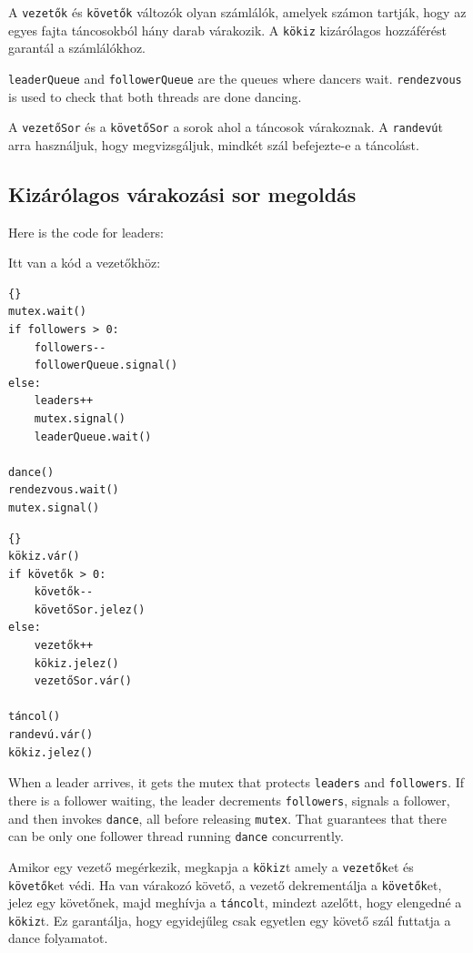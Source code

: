 \documentclass{book}
\newcommand{\clearemptydoublepage}{\newpage\cleardoublepage}
\begin{document}
A {\tt vezetők} és {\tt követők} változók olyan számlálók, amelyek számon
tartják, hogy az egyes fajta táncosokból hány darab várakozik.
A {\tt kökiz} kizárólagos hozzáférést garantál a számlálókhoz.

{\tt leaderQueue} and {\tt followerQueue} are the queues where
dancers wait.  {\tt rendezvous} is used to check that both threads
are done dancing.

A {\tt vezetőSor} és a {\tt követőSor} a sorok ahol a táncosok várakoznak.
A {\tt randevú}t arra használjuk, hogy megvizsgáljuk, mindkét szál
befejezte-e a táncolást.

\clearemptydoublepage
\subsection {Kizárólagos várakozási sor megoldás}

Here is the code for leaders:

Itt van a kód a vezetőkhöz:

\begin{lstlisting}[title={Queue solution (leaders)}]{}
mutex.wait()
if followers > 0:
    followers--
    followerQueue.signal()
else:
    leaders++
    mutex.signal()
    leaderQueue.wait()    

dance()
rendezvous.wait()
mutex.signal()
\end{lstlisting}

\begin{lstlisting}[title={Kizárólagos várakozási sor megoldás (vezetők)}]{}
kökiz.vár()
if követők > 0:
    követők--
    követőSor.jelez()
else:
    vezetők++
    kökiz.jelez()
    vezetőSor.vár()    

táncol()
randevú.vár()
kökiz.jelez()
\end{lstlisting}

When a leader arrives, it gets the mutex that protects {\tt leaders}
and {\tt followers}.  If there is a follower waiting, the leader
decrements {\tt followers}, signals a follower, and then invokes
{\tt dance}, all before releasing {\tt mutex}.  That guarantees that
there can be only one follower thread running {\tt dance}
concurrently.

Amikor egy vezető megérkezik, megkapja a {\tt kökiz}t amely a {\tt vezetők}et és
{\tt követők}et védi. Ha van várakozó követő, a vezető dekrementálja a
{\tt követők}et, jelez egy követőnek, majd meghívja a {\tt táncol}t, mindezt
azelőtt, hogy elengedné a {\tt kökiz}t. Ez garantálja, hogy egyidejűleg
csak egyetlen egy követő szál futtatja a dance folyamatot.
\end{document}
